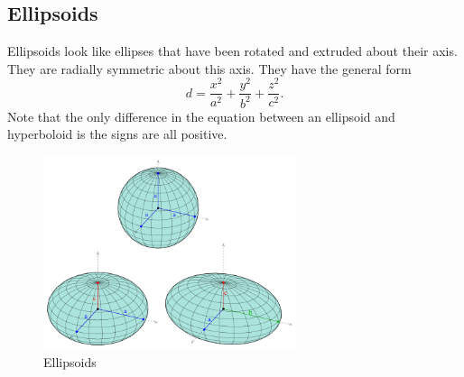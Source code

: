 \subsection{Ellipsoids}
\noindent
Ellipsoids look like ellipses that have been rotated and extruded about their axis.
They are radially symmetric about this axis.
They have the general form 
\begin{equation*}
	d = \frac{x^2}{a^2} + \frac{y^2}{b^2} + \frac{z^2}{c^2}.
\end{equation*}
Note that the only difference in the equation between an ellipsoid and hyperboloid is the signs are all positive.

\begin{figure}[H]
	\centering
	\includegraphics[width=0.66\textwidth]{./Images/differentialMultivariableCalculus/ellipsoids.png}
	\caption{Ellipsoids}
\end{figure}